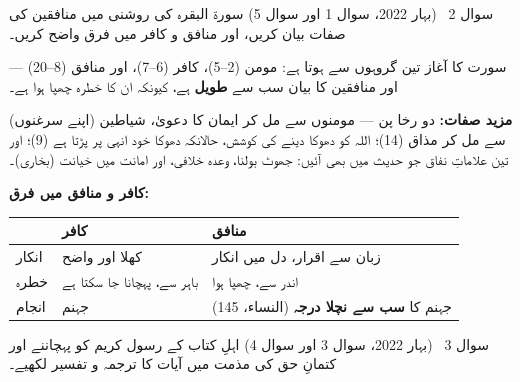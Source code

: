 \begin{sawal}{سوال \textenglish{2} \ \textnormal{\small(بہار \textenglish{2022}، سوال \textenglish{1} اور سوال \textenglish{5})}}
سورۃ البقرہ کی روشنی میں منافقین کی صفات بیان کریں، اور منافق و کافر میں فرق
واضح کریں۔
\end{sawal}

\begin{hal}
سورت کا آغاز تین گروہوں سے ہوتا ہے: مومن (\textenglish{2--5})، کافر
(\textenglish{6--7})، اور منافق (\textenglish{8--20}) --- اور منافقین کا بیان
سب سے \textbf{طویل} ہے، کیونکہ ان کا خطرہ چھپا ہوا ہے۔


\medskip
\textbf{مزید صفات:} دو رخا پن --- مومنوں سے مل کر ایمان کا دعویٰ، شیاطین
(اپنے سرغنوں) سے مل کر مذاق (\textenglish{14})؛ اللہ کو دھوکا دینے کی کوشش،
حالانکہ دھوکا خود انہی پر پڑتا ہے (\textenglish{9})؛ اور تین علاماتِ نفاق جو
حدیث میں بھی آئیں: جھوٹ بولنا، وعدہ خلافی، اور امانت میں خیانت (بخاری)۔

\medskip
\textbf{کافر و منافق میں فرق:}
\begin{center}
\begin{tabular}{@{}p{3.0cm} p{5.5cm} p{5.5cm}@{}}
\toprule
 & \textbf{کافر} & \textbf{منافق} \\
\midrule
انکار & کھلا اور واضح & زبان سے اقرار، دل میں انکار \\
خطرہ & باہر سے، پہچانا جا سکتا ہے & اندر سے، چھپا ہوا \\
انجام & جہنم & جہنم کا \textbf{سب سے نچلا درجہ} (النساء، \textenglish{145}) \\
\bottomrule
\end{tabular}
\end{center}
\end{hal}

\begin{sawal}{سوال \textenglish{3} \ \textnormal{\small(بہار \textenglish{2022}، سوال \textenglish{3} اور سوال \textenglish{4})}}
اہلِ کتاب کے رسول کریم \saw کو پہچاننے اور کتمانِ حق کی مذمت میں آیات کا ترجمہ
و تفسیر لکھیے۔
\end{sawal}

